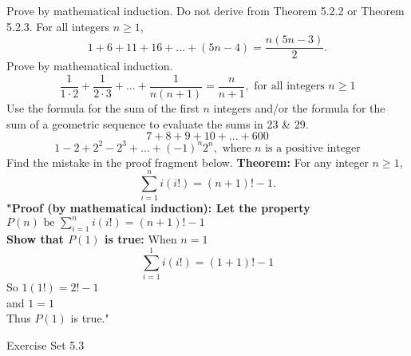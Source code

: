 \documentclass[12pt,letterpaper, onecolumn]{exam}
\begin{document}
\begin{questions}
		Prove by mathematical induction. Do not derive from Theorem 5.2.2 or Theorem 5.2.3.
		\setcounter{question}{6}\question For all integers $n\geq1$,
		$$1+6+11+16+...+(5n-4)=\frac{n(5n-3)}{2}.$$
		Prove by mathematical induction.
		\setcounter{question}{11}\question $$\frac{1}{1\cdot2}+\frac{1}{2\cdot3}+...+\frac{1}{n(n+1)}=\frac{n}{n+1}, \textrm{ for all integers $n\geq1$}$$
		Use the formula for the sum of the first $n$ integers and/or the formula for the sum of a geometric sequence to evaluate the sums in 23 \& 29.
		\setcounter{question}{22}\question $$7+8+9+10+...+600$$
		\setcounter{question}{28}\question $$1-2+2^2-2^3+...+(-1)^n2^n, \textrm{ where $n$ is a positive integer}$$
		Find the mistake in the proof fragment below.
		\setcounter{question}{34}\question \textbf{Theorem:} For any integer $n\geq1,$
		$$\sum_{i=1}^{n}i(i!)=(n+1)!-1.$$
		\textbf{"Proof (by mathematical induction): Let the property} $P(n) \textrm{ be } \sum_{i=1}^{n}i(i!)=(n+1)!-1$\\
		\textbf{Show that $P(1)$ is true:} When $n=1$
		$$\sum_{i=1}^{1}i(i!)=(1+1)!-1$$
		So $1(1!)=2!-1$\\
		and $1=1$\\
		Thus $P(1)$ is true."\\
			\end{questions}
		\centering\large Exercise Set 5.3\\
\end{document}
